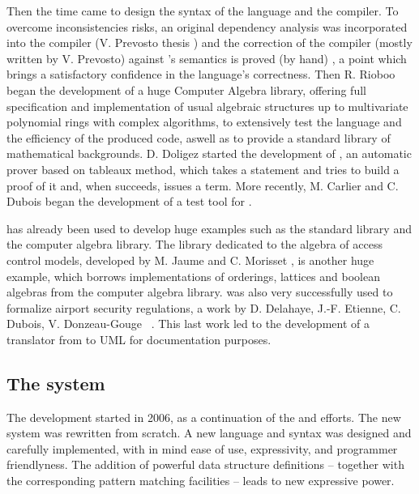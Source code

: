 Then the time came to design the syntax of the language and the compiler. To
overcome inconsistencies risks, an original dependency analysis was
incorporated into the compiler (V. Prevosto
thesis \cite{PrevostoPhD03,TPHOL2002,PrevostoJAR02}) and the correction of the
compiler (mostly written by V. Prevosto) against {\oldfocal}'s semantics is
proved (by hand) \cite{TLCA2005}, a point which
brings a satisfactory confidence in the language's correctness. Then
R. Rioboo\cite{BHR2} began the development of a huge Computer Algebra
library, offering full specification
and implementation of usual algebraic structures up to multivariate
polynomial rings with complex algorithms, to
extensively test the language and the
efficiency  of the produced code, aswell as to provide a standard library
of mathematical backgrounds. D. Doligez \cite{ZenonBDD} started the
development of {\zenon}, an automatic prover based on tableaux method,
which takes a {\oldfocal} statement and tries to build a proof of it and,
when succeeds,  issues a {\coq} term. More  recently, M. Carlier and
C. Dubois\cite{CarlierDuboisLNCS2008} began the development of a
test tool for {\oldfocal}.

{\oldfocal} has already been used to develop huge examples such as  the
standard library and the computer algebra library. The library
dedicated to the algebra of access control models, developed by
M. Jaume and C. Morisset \cite{jias06,fcsarspa06,MorissetPhd},
is another huge example, which borrows implementations of orderings,
lattices and boolean algebras from the computer algebra library.
{\oldfocal} was also very successfully used to formalize airport security
regulations, a work by D. Delahaye, J.-F. Etienne, C.  Dubois,
V. Donzeau-Gouge ~\cite{EDEMOI-All,EDEMOI-Model,EDEMOI-Proof}. This
last work led to the development of a translator \cite{Focal-UML}
from {\oldfocal} to UML for documentation purposes.

\subsection*{The {\focal} system}

The {\focal} development started in 2006, as a
continuation of the {\foc} and {\oldfocal} efforts. The new system was rewritten
from scratch. A new language and syntax was designed and carefully
implemented, with in mind ease of use, expressivity, and programmer
friendlyness. The addition of powerful data structure definitions -- together
with the corresponding pattern matching facilities -- leads to new expressive
power.

